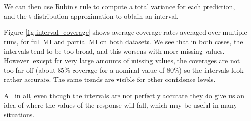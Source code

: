  We can then use Rubin's rule  to compute a total variance for each prediction, and the t-distribution approximation to obtain an interval. 

Figure \ref{fig.interval_coverage} shows average coverage rates averaged over multiple runs, for full MI and partial MI on both datasets. We see that in both cases, the intervals tend to be too broad, and this worsens with more missing values. However, except for very large amounts of missing values, the coverages are not too far off (about 85\% coverage for a nominal value of 80\%) so the intervals look rather accurate. The same trends are visible for other confidence levels.



All in all, even though the intervals are not perfectly accurate they do give us an idea of where the values of the response will fall, which may be useful in many situations.
